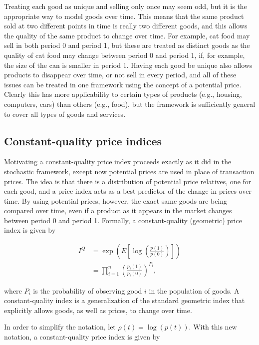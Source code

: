 \documentclass[]{article}
\begin{document}
Treating each good as unique and selling only once may seem odd, but it is the appropriate way to model goods over time. This means that the same product sold at two different points in time is really two different goods, and this allows the quality of the same product to change over time. For example, cat food may sell in both period 0 and period 1, but these are treated as distinct goods as the quality of cat food may change between period 0 and period 1, if, for example, the size of the can is smaller in period 1. Having each good be unique also allows products to disappear over time, or not sell in every period, and all of these issues can be treated in one framework using the concept of a potential price. Clearly this has more applicability to certain types of products (e.g., housing, computers, cars) than others (e.g., food), but the framework is sufficiently general to cover all types of goods and services.

\hypertarget{constant-quality-price-indices}{%
\subsection{Constant-quality price indices}\label{constant-quality-price-indices}}

Motivating a constant-quality price index proceeds exactly as it did in the stochastic framework, except now potential prices are used in place of transaction prices. The idea is that there is a distribution of potential price relatives, one for each good, and a price index acts as a best predictor of the change in prices over time. By using potential prices, however, the exact same goods are being compared over time, even if a product as it appears in the market changes between period 0 and period 1. Formally, a constant-quality (geometric) price index is given by

\begin{align*}
I^{Q} &= \exp\left(E\left[\log\left(\frac{p(1)}{p(0)}\right)\right]\right) \\
&= \prod_{i = 1}^{n} \left(\frac{p_{i}(1)}{p_{i}(0)}\right)^{P_{i}},
\end{align*}

where \(P_{i}\) is the probability of observing good \(i\) in the population of goods. A constant-quality index is a generalization of the standard geometric index that explicitly allows goods, as well as prices, to change over time.

In order to simplify the notation, let \(\rho(t) = \log(p(t))\). With this new notation, a constant-quality price index is given by
\end{document}
